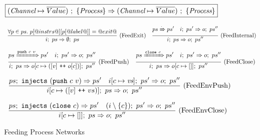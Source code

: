 
\begin{figure}

\newcommand\vs {\ti{vs}}
\newcommand\ps {\ti{ps}}

$$
  \boxed{
    (\textit{Channel} \mapsto \overline{Value})~;~\{ \textit{Process} \} \Rightarrow (\textit{Channel} \mapsto \overline{Value})~;~\{ \textit{Process} \}
  }
$$

$$
\enskip \frac {\displaystyle 
  \forall p \in ps.~
  p[@instrs@][p[@label@]] = @exit@
} {\displaystyle 
  i;~ps \Rightarrow \emptyset;~ps
} \  \mbox{(FeedExit)} \enskip
\enskip \frac {\displaystyle 
  ps \xRightarrow{\cdot} ps'
\quad
  i;~ps' \Rightarrow o;~ps''
} {\displaystyle 
  i;~ps \Rightarrow o;~ps''
} \  \mbox{(FeedInternal)} \enskip
$$

$$
\enskip \frac {\displaystyle 
  ps \xRightarrow{\texttt{push}~c~v} ps'
\quad
  i;~ps' \Rightarrow o;~ps''
} {\displaystyle 
  i;~ps \Rightarrow o[c \mapsto ([v] ~\texttt{++}~ o[c])];~ps''
} \  \mbox{(FeedPush)} \enskip
\enskip \frac {\displaystyle 
  ps \xRightarrow{\texttt{close}~c} ps'
\quad
  i;~ps' \Rightarrow o;~ps''
} {\displaystyle 
  i;~ps \Rightarrow o[c \mapsto []];~ps''
} \  \mbox{(FeedClose)} \enskip
$$





$$
\ruleIN{
  \ProcsInject
    {ps}
    {(\Push~c~v)}
    {ps'}
\quad
  \ProcsFeed
    {i[c \mapsto \vs]}
    {ps'}
    {o}
    {ps''}
}{
  \ProcsFeed
    {i[c \mapsto ([v] \listappend vs)]}
    {ps}
    {o}
    {ps''}
}{FeedEnvPush}
$$

$$
\enskip \frac {\displaystyle 
  ps;~\texttt{injects}~(\texttt{close}~c) \Rightarrow ps'
\quad
  (i\setminus\{ c \});~ps' \Rightarrow o;~ps''
} {\displaystyle 
  i[c \mapsto [] ];~ps \Rightarrow o;~ps''
} \  \mbox{(FeedEnvClose)} \enskip
$$



\caption{Feeding Process Networks}
\label{fig:Process:Eval:Feed}
\end{figure}

